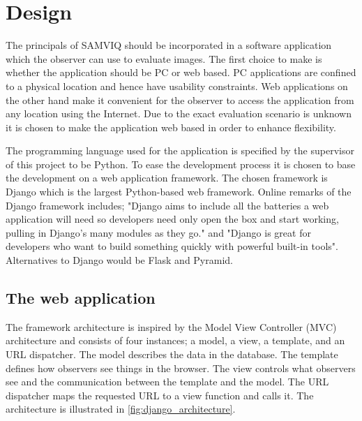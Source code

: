 \graphicspath{{Chapters/Design/}}

\chapter{Design}
\label{cha:design}

The principals of SAMVIQ should be incorporated in a software application which the observer can use to evaluate images. The first choice to make is whether the application should be PC or web based. PC applications are confined to a physical location and hence have usability constraints. Web applications on the other hand make it convenient for the observer to access the application from any location using the Internet. Due to the exact evaluation scenario is unknown it is chosen to make the application web based in order to enhance flexibility.

The programming language used for the application is specified by the supervisor of this project to be Python. To ease the development process it is chosen to base the development on a web application framework. The chosen framework is Django \cite{django} which is the largest Python-based web framework. Online remarks of the Django framework includes; "Django aims to include all the batteries a web application will need so developers need only open the box and start working, pulling in Django's many modules as they go." \cite{airpair} and "Django is great for developers who want to build something quickly with powerful built-in tools"\cite{six_feet_up}. Alternatives to Django would be Flask\cite{flask} and Pyramid\cite{pyramid}.

\section{The web application} %
\label{sec:the_web_application}

The framework architecture is inspired by the Model View Controller (MVC) architecture and consists of four instances; a model, a view, a template, and an URL dispatcher. The model describes the data in the database. The template defines how observers see things in the browser. The view controls what observers see and the communication between the template and the model. The URL dispatcher maps the requested URL to a view function and calls it. The architecture is illustrated in \autoref{fig:django_architecture}.

